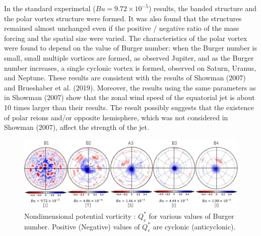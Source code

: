 \documentclass[a4j,8pt]{jarticle}
\begin{document}
In the standard experimetal ($Bu = 9.72\times 10^{-5}$) results,
the banded structure and
the polar vortex structure were formed.
%
It was also found that the structures remained almost unchanged
even if the positive / negative
ratio of the mass forcing and the spatial size were varied.
%
The characteristics of the polar vortex were
found to depend on the value of Burger number:
when the Burger number is small,
small multiple vortices are formed, as observed Jupiter,
and as the Burger number increases,
a single cyclonic vortex is formed, observed on Saturn, Uranus, and Neptune.
%
These results are consistent with the results of Showman (2007) and Brueshaber et al. (2019).
%
Moreover, the results using the same parameters as in Showman (2007) show that
the zonal wind speed of the equatorial jet is
about 10 times larger than their results.
%
The result possibly suggests that the existence of polar reions and/or opposite hemisphere,
which was not considered in Showman (2007), affect the strength of the jet.
%
\begin{figure}[b]
  \begin{center}
  \includegraphics[width=12cm]{./fig/case1_nonqv_a.png}
  \caption{\footnotesize{Nondimensional potential vorticity : $Q_e^*$ for various values of Burger number.
Positive (Negative) values of $Q_e^*$ are cyclonic (anticyclonic).
}}
  \label{case1:nonqv_a}
  \end{center}
\end{figure}
\end{document}
